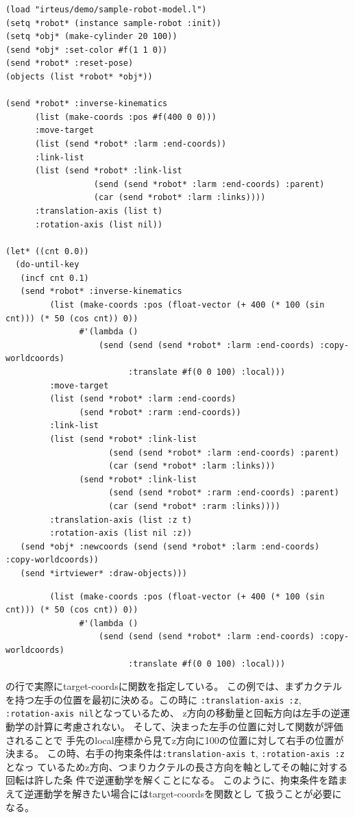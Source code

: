 {\baselineskip=10pt
\begin{verbatim}
(load "irteus/demo/sample-robot-model.l")
(setq *robot* (instance sample-robot :init))
(setq *obj* (make-cylinder 20 100))
(send *obj* :set-color #f(1 1 0))
(send *robot* :reset-pose)
(objects (list *robot* *obj*))

(send *robot* :inverse-kinematics
      (list (make-coords :pos #f(400 0 0)))
      :move-target
      (list (send *robot* :larm :end-coords))
      :link-list
      (list (send *robot* :link-list
                  (send (send *robot* :larm :end-coords) :parent)
                  (car (send *robot* :larm :links))))
      :translation-axis (list t)
      :rotation-axis (list nil))

(let* ((cnt 0.0))
  (do-until-key
   (incf cnt 0.1)
   (send *robot* :inverse-kinematics
         (list (make-coords :pos (float-vector (+ 400 (* 100 (sin cnt))) (* 50 (cos cnt)) 0))
               #'(lambda ()
                   (send (send (send *robot* :larm :end-coords) :copy-worldcoords)
                         :translate #f(0 0 100) :local)))
         :move-target
         (list (send *robot* :larm :end-coords)
               (send *robot* :rarm :end-coords))
         :link-list
         (list (send *robot* :link-list
                     (send (send *robot* :larm :end-coords) :parent)
                     (car (send *robot* :larm :links)))
               (send *robot* :link-list
                     (send (send *robot* :rarm :end-coords) :parent)
                     (car (send *robot* :rarm :links))))
         :translation-axis (list :z t)
         :rotation-axis (list nil :z))
   (send *obj* :newcoords (send (send *robot* :larm :end-coords) :copy-worldcoords))
   (send *irtviewer* :draw-objects)))
\end{verbatim}
}

{\baselineskip=10pt
\begin{verbatim}
         (list (make-coords :pos (float-vector (+ 400 (* 100 (sin cnt))) (* 50 (cos cnt)) 0))
               #'(lambda ()
                   (send (send (send *robot* :larm :end-coords) :copy-worldcoords)
                         :translate #f(0 0 100) :local)))
\end{verbatim}
}

の行で実際にtarget-coordsに関数を指定している。
この例では、まずカクテルを持つ左手の位置を最初に決める。この時に
\verb|:translation-axis :z|, \verb|:rotation-axis nil|となっているため、
z方向の移動量と回転方向は左手の逆運動学の計算に考慮されない。
そして、決まった左手の位置に対して関数が評価されることで
手先のlocal座標から見てz方向に100の位置に対して右手の位置が決まる。
この時、右手の拘束条件は\verb|:translation-axis t|, \verb|:rotation-axis :z|となっ
ているためz方向、つまりカクテルの長さ方向を軸としてその軸に対する回転は許した条
件で逆運動学を解くことになる。
このように、拘束条件を踏まえて逆運動学を解きたい場合にはtarget-coordsを関数とし
て扱うことが必要になる。

